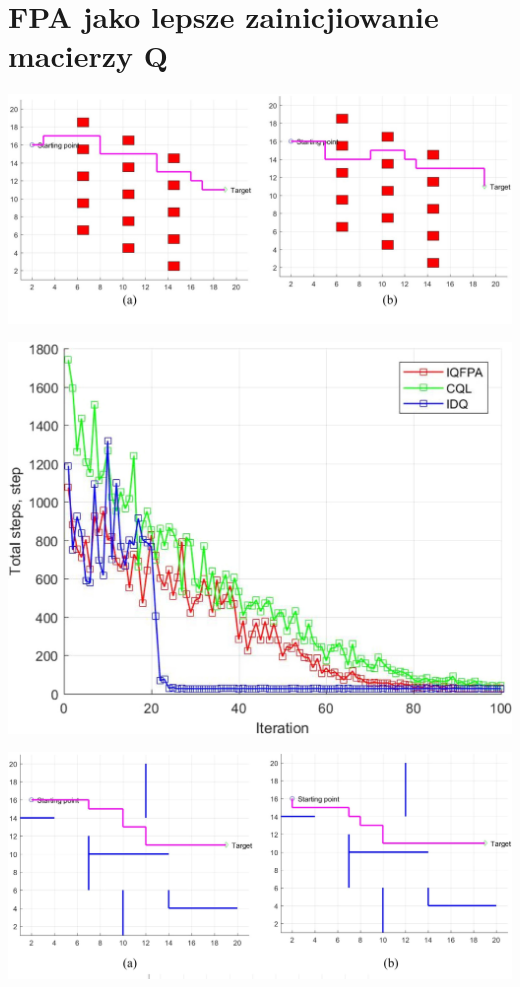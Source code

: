 \documentclass[aspectratio=169,15pt,]{beamer}
\begin{document}
\section{FPA jako lepsze zainicjiowanie macierzy Q}
\begin{frame}
	\sectionpage

\end{frame}
\begin{frame}
\includegraphics[width =\textwidth,height=\textheight]{Obrazy/Test2.jpg}
\end{frame}
\begin{frame}
\includegraphics[width =\textwidth,height=\textheight]{Obrazy/Test1.jpg}
\end{frame}
\begin{frame}
\includegraphics[width =\textwidth,height=\textheight]{Obrazy/Test3.jpg}
\end{frame}
\end{document}
